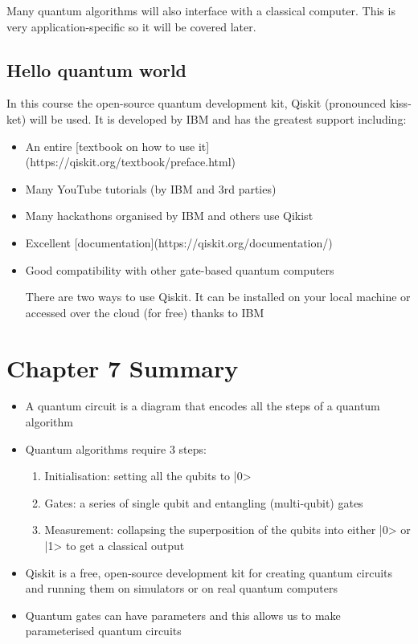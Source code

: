 \documentclass{book}
\begin{document}
Many quantum algorithms will also interface with a classical computer. This is very application-specific so it will be covered later. 


\subsection{Hello quantum world}

In this course the open-source quantum development kit, Qiskit (pronounced kiss-ket) will be used. It is developed by IBM and has the greatest support including: 

\begin{itemize}

    \item An entire [textbook on how to use it](https://qiskit.org/textbook/preface.html) 
    \item Many YouTube tutorials (by IBM and 3rd parties)
    \item Many hackathons organised by IBM and others use Qikist
    \item Excellent [documentation](https://qiskit.org/documentation/) 
    \item Good compatibility with other gate-based quantum computers

There are two ways to use Qiskit. It can be installed on your local machine or accessed over the cloud (for free) thanks to IBM
\end{itemize}
\section{Chapter 7 Summary}

\begin{itemize}
\item A quantum circuit is a diagram that encodes all the steps of a quantum algorithm
\item Quantum algorithms require 3 steps:
\begin{enumerate}
    \item Initialisation: setting all the qubits to |0>
    \item Gates: a series of single qubit and entangling (multi-qubit) gates
    \item Measurement: collapsing the superposition of the qubits into either |0> or |1> to get a classical output 
\end{enumerate}
\item Qiskit is a free, open-source development kit for creating quantum circuits and running them on simulators or on real quantum computers
\item Quantum gates can have parameters and this allows us to make parameterised quantum circuits 

\end{itemize}
\end{document}

